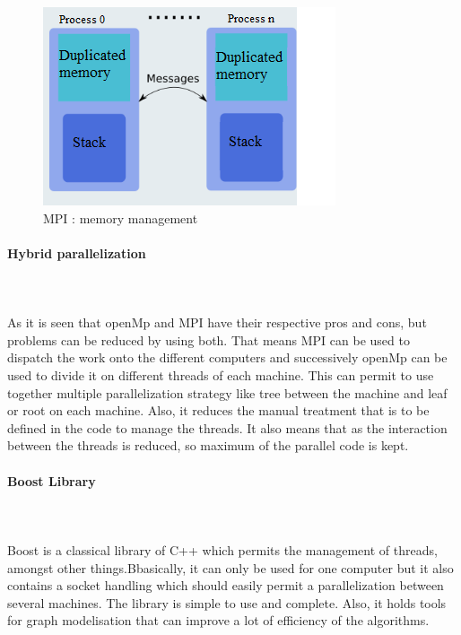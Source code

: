 \begin{figure}[!h] 
\centerline{\includegraphics[scale=0.85]{3_Software_considered/MultithreadingMP_boost_Visual_MPI_5000_Zotero_Project_Baptiste/MPI}}
   \caption{\label{étiquette} MPI : memory management}
\label{fig:MPI}
\end{figure}


\paragraph{Hybrid parallelization}\mbox{}\\\mbox{}\\

	As it  is seen that openMp and MPI have  their respective pros and cons, but problems can be reduced by using both. That means MPI can be used to dispatch the work onto the different computers and successively  openMp can be used to divide it on different threads of each machine. This can permit to use together multiple parallelization strategy like tree between the machine and leaf or root on each machine. Also, it reduces the manual treatment that is to be defined in the code to manage the threads. It also means  that as the interaction between the threads is reduced, so maximum of the parallel code is kept.

\paragraph{Boost Library}\mbox{}\\\mbox{}\\

	Boost is a classical library of C++ which permits the management of threads, amongst other things.Bbasically, it can only be  used for one computer but it also contains a socket handling which should easily permit a parallelization between several machines. The library is simple to use and complete. Also, it holds tools for graph modelisation that can improve a lot  of efficiency of the algorithms.

